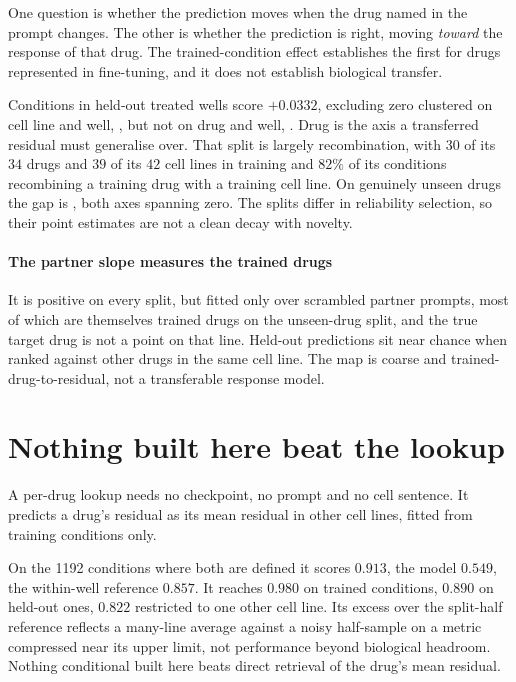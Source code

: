 One question is whether the prediction moves when the drug named in the prompt
changes. The other is whether the prediction is right, moving \emph{toward} the
response of that drug. The trained-condition effect establishes the first for
drugs represented in fine-tuning, and it does not establish biological transfer.

Conditions in held-out treated wells score $+0.0332$, excluding zero clustered
on cell line and well, , but not on drug and well,
. Drug is the axis a transferred residual must
generalise over. That split is largely recombination, with $30$ of its $34$ drugs
and $39$ of its $42$ cell lines in training and $82\%$ of its conditions
recombining a training drug with a training cell line. On genuinely unseen drugs
the gap is , both axes spanning zero. The splits
differ in reliability selection, so their point estimates are not a clean decay
with novelty.

\paragraph{The partner slope measures the trained drugs} It is positive on every
split, but fitted only over scrambled partner prompts, most of which are
themselves trained drugs on the unseen-drug split, and the true target drug is
not a point on that line. Held-out predictions sit near chance when ranked
against other drugs in the same cell line. The map is coarse and
trained-drug-to-residual, not a transferable response model.

\section{Nothing built here beat the lookup}

A per-drug lookup needs no checkpoint, no prompt and no cell
sentence. It predicts a drug's residual as its mean residual in other cell lines,
fitted from training conditions only.

On the \num{1192} conditions where both are defined it scores $0.913$, the model
$0.549$, the within-well reference $0.857$. It reaches $0.980$ on trained
conditions, $0.890$ on held-out ones, $0.822$ restricted to one other cell line.
Its excess over the split-half reference reflects a many-line average against a
noisy half-sample on a metric compressed near its upper limit, not performance
beyond biological headroom. Nothing conditional built here beats direct retrieval
of the drug's mean residual.

